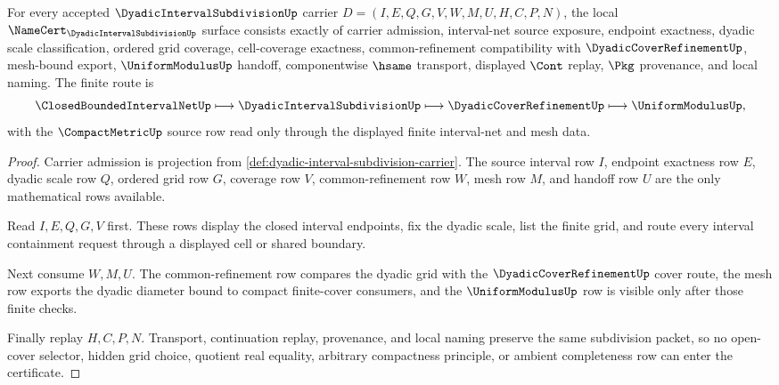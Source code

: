 \begin{theorem}
\label{thm:dyadic-interval-subdivision-namecert-obligations}
For every accepted $\DyadicIntervalSubdivisionUp$ carrier $D=(I,E,Q,G,V,W,M,U,H,C,P,N)$, the local $\NameCert_{\DyadicIntervalSubdivisionUp}$ surface consists exactly of carrier admission, interval-net source exposure, endpoint exactness, dyadic scale classification, ordered grid coverage, cell-coverage exactness, common-refinement compatibility with $\DyadicCoverRefinementUp$, mesh-bound export, $\UniformModulusUp$ handoff, componentwise $\hsame$ transport, displayed $\Cont$ replay, $\Pkg$ provenance, and local naming. The finite route is
$$
\ClosedBoundedIntervalNetUp
\longmapsto
\DyadicIntervalSubdivisionUp
\longmapsto
\DyadicCoverRefinementUp
\longmapsto
\UniformModulusUp ,
$$
with the $\CompactMetricUp$ source row read only through the displayed finite interval-net and mesh data.
\end{theorem}
\begin{proof}
Carrier admission is projection from \autoref{def:dyadic-interval-subdivision-carrier}. The source interval row $I$, endpoint exactness row $E$, dyadic scale row $Q$, ordered grid row $G$, coverage row $V$, common-refinement row $W$, mesh row $M$, and handoff row $U$ are the only mathematical rows available.

Read $I,E,Q,G,V$ first. These rows display the closed interval endpoints, fix the dyadic scale, list the finite grid, and route every interval containment request through a displayed cell or shared boundary.

Next consume $W,M,U$. The common-refinement row compares the dyadic grid with the $\DyadicCoverRefinementUp$ cover route, the mesh row exports the dyadic diameter bound to compact finite-cover consumers, and the $\UniformModulusUp$ row is visible only after those finite checks.

Finally replay $H,C,P,N$. Transport, continuation replay, provenance, and local naming preserve the same subdivision packet, so no open-cover selector, hidden grid choice, quotient real equality, arbitrary compactness principle, or ambient completeness row can enter the certificate.
\end{proof}



